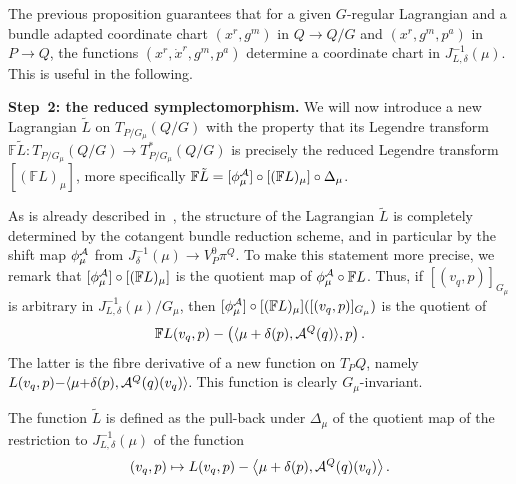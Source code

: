 \documentclass[11pt]{article}
\newcommand{\A}{{\cal A}}
\newcommand{\F}{\mathbb{F}}
\begin{document}
The previous proposition guarantees that for a given $G$-regular Lagrangian and a bundle adapted coordinate chart $(x^r,g^m)$ in $Q\to Q/G$ and $(x^r,g^m,p^a)$ in $P\to Q$, the functions $(x^r,\dot x^r,g^m,p^a)$ determine a coordinate chart in $J^{-1}_{L,\delta}(\mu)$. This is useful in the following.

{\bf Step~2: the reduced symplectomorphism.}
We will now introduce a new Lagrangian $\tilde L$ on $T_{P/G_\mu}(Q/G)$ with the property that its Legendre transform $\F \tilde L: T_{P/G_\mu} (Q/G) \to T^*_{P/G_\mu}(Q/G)$ is precisely the reduced Legendre transform $[(\F L)_\mu]$, more specif\/ically $\F \tilde L= [\phi^\A_\mu]\circ[(\F L)_\mu] \circ \Delta_\mu$.

As is already described in~\cite{BC}, the structure of the Lagrangian $\tilde L$ is completely determined by the cotangent bundle reduction scheme, and in particular by the shift map $\phi^\A_\mu$ from $J^{-1}_\delta(\mu) \to V^0_P\pi^Q$. To make this statement more precise, we remark that $[\phi^\A_\mu]\circ[(\F L)_\mu]$ is the quotient map of $\phi^\A_\mu\circ \F L$. Thus, if $[(v_q,p)]_{G_\mu}$ is arbitrary in $J^{-1}_{L,\delta}(\mu)/G_\mu$, then $[\phi^\A_\mu]\circ[(\F L)_\mu]([(v_q,p)]_{G_\mu})$ is the quotient of \[\F L(v_q,p) - \left(\langle\mu+\delta(p),\A^Q(q)\rangle,p\right).\]
 The latter is the f\/ibre derivative of a new function on $T_PQ$, namely $L(v_q,p) {-} \langle \mu{+}\delta(p),\A^Q(q)(v_q)\rangle.\!$ This function is clearly $G_\mu$-invariant.

\begin{definition} The function $\tilde L$ is def\/ined as the pull-back under $\Delta_\mu$ of the quotient map of the restriction to $J^{-1}_{L,\delta}(\mu)$ of the function \[
(v_q,p) \mapsto L(v_q,p)- \left\langle \mu+\delta(p), \A^Q(q)(v_q)\right\rangle.
\]
\end{definition}
\end{document}
